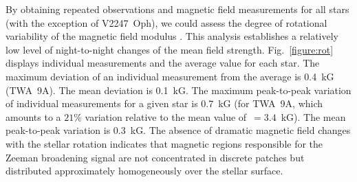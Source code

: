 \documentclass{aa}
\begin{document}
By obtaining repeated observations and magnetic field measurements for all stars (with the exception of V2247~Oph), we could assess the degree of rotational variability of the magnetic field modulus {\bb}. This analysis establishes a relatively low level of night-to-night changes of the mean field strength. Fig.~\ref{figure:rot} displays individual {\bb} measurements and the average value for each star. The maximum deviation of an individual measurement from the average is 0.4~kG (TWA~9A). The mean deviation is 0.1~kG. The maximum peak-to-peak variation of individual {\bb} measurements for a given star is 0.7~kG (for TWA~9A, which amounts to a $21\%$ variation relative to the mean value of {\bb}\,$=3.4$~kG). The mean peak-to-peak variation is 0.3~kG. The absence of dramatic magnetic field changes with the stellar rotation indicates that magnetic regions responsible for the Zeeman broadening signal are not concentrated in discrete patches but distributed approximately homogeneously over the stellar surface.
\end{document}
